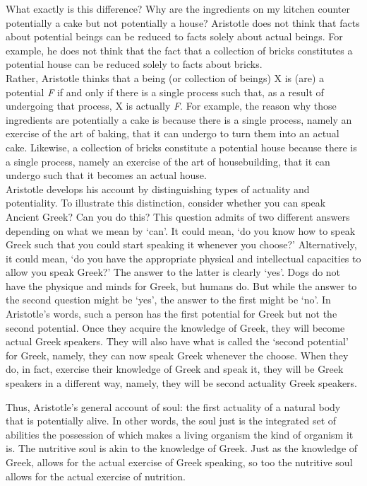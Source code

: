 \documentclass[11pt]{article}
\begin{document}
\noindent What exactly is this difference? Why are the ingredients on my kitchen counter potentially a cake but not potentially a house? Aristotle does not think that facts about potential beings can be reduced to facts solely about actual beings. For example, he does not think that the fact that a collection of bricks constitutes a potential house can be reduced solely to facts about bricks.\\

\noindent Rather, Aristotle thinks that a being (or collection of beings) X is (are) a potential \emph{F} if and only if there is a single process such that, as a result of undergoing that process, X is actually \emph{F}. For example, the reason why those ingredients are potentially a cake is because there is a single process, namely an exercise of the art of baking, that it can undergo to turn them into an actual cake. Likewise, a collection of bricks constitute a potential house because there is a single process, namely an exercise of the art of housebuilding, that it can undergo such that it becomes an actual house.\\

\noindent Aristotle develops his account by distinguishing types of actuality and potentiality. To illustrate this distinction, consider whether you can speak Ancient Greek? Can you do this? This question admits of two different answers depending on what we mean by `can'. It could mean, `do you know how to speak Greek such that you could start speaking it whenever you choose?' Alternatively, it could mean, `do you have the appropriate physical and intellectual capacities to allow you speak Greek?' The answer to the latter is clearly `yes'. Dogs do not have the physique and minds for Greek, but humans do. But while the answer to the second question might be `yes', the answer to the first might be `no'. In Aristotle's words, such a person has the first potential for Greek but not the second potential. Once they acquire the knowledge of Greek, they will become actual Greek speakers. They will also have what is called the `second potential' for Greek, namely, they can now speak Greek whenever the choose. When they do, in fact, exercise their knowledge of Greek and speak it, they will be Greek speakers in a different way, namely, they will be second actuality Greek speakers. 



\noindent Thus, Aristotle's general account of soul: the first actuality of a natural body that is potentially alive. In other words, the soul just is the integrated set of abilities the possession of which makes a living organism the kind of organism it is. The nutritive soul is akin to the knowledge of Greek. Just as the knowledge of Greek, allows for the actual exercise of Greek speaking, so too the nutritive soul allows for the actual exercise of nutrition.\\
\end{document}

